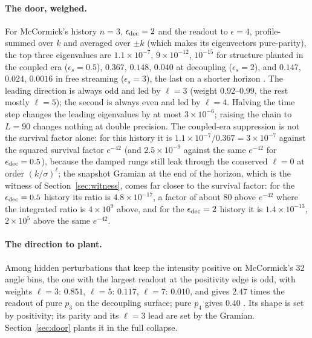 \paragraph{The door, weighed.} For McCormick's history $n=3$, $\epsilon_{\rm dec}=2$ and the readout to $\epsilon=4$, profile-summed over $k$ and averaged over $\pm k$ (which makes its eigenvectors pure-parity), the top three eigenvalues are $1.1\times10^{-7}$, $9\times10^{-12}$, $10^{-15}$ for structure planted in the coupled era ($\epsilon_s=0.5$), $0.367$, $0.148$, $0.040$ at decoupling ($\epsilon_s=2$), and $0.147$, $0.024$, $0.0016$ in free streaming ($\epsilon_s=3$), the last on a shorter horizon . The leading direction is always odd and led by $\ell=3$ (weight $0.92$--$0.99$, the rest mostly $\ell=5$); the second is always even and led by $\ell=4$. Halving the time step changes the leading eigenvalues by at most $3\times10^{-6}$; raising the chain to $L=90$ changes nothing at double precision. The coupled-era suppression is not the survival factor alone: for this history it is $1.1\times10^{-7}/0.367=3\times10^{-7}$ against the squared survival factor $e^{-42}$ (and $2.5\times10^{-9}$ against the same $e^{-42}$ for $\epsilon_{\rm dec}=0.5$), because the damped rungs still leak through the conserved $\ell=0$ at order $(k/\sigma)^\ell$; the snapshot Gramian at the end of the horizon, which is the witness of Section~\ref{sec:witness}, comes far closer to the survival factor: for the $\epsilon_{\rm dec}=0.5$ history its ratio is $4.8\times10^{-17}$, a factor of about $80$ above $e^{-42}$ where the integrated ratio is $4\times10^{9}$ above, and for the $\epsilon_{\rm dec}=2$ history it is $1.4\times10^{-13}$, $2\times10^{5}$ above the same $e^{-42}$.

\paragraph{The direction to plant.} Among hidden perturbations that keep the intensity positive on McCormick's 32 angle bins, the one with the largest readout at the positivity edge is odd, with weights $\ell=3$: $0.851$, $\ell=5$: $0.117$, $\ell=7$: $0.010$, and gives $2.47$ times the readout of pure $p_3$ on the decoupling surface; pure $p_4$ gives $0.40$ . Its shape is set by positivity; its parity and its $\ell=3$ lead are set by the Gramian. Section~\ref{sec:door} plants it in the full collapse.

